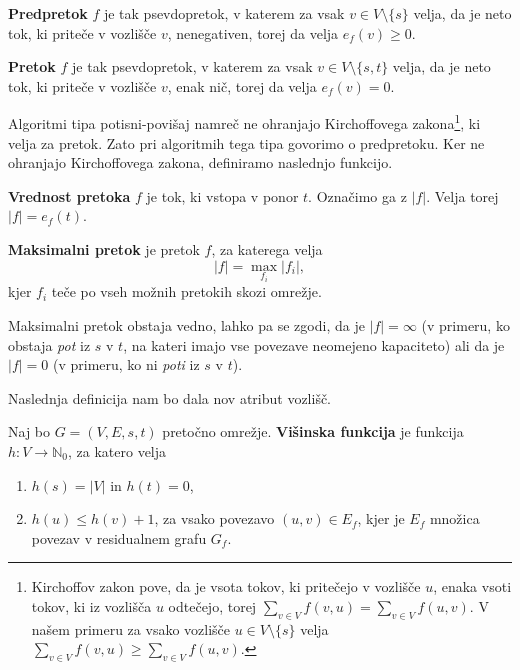 \documentclass[mat1]{fmfdelo}
\newcommand{\N}{\mathbb N}
\begin{document}
\begin{definicija}
\textbf{Predpretok} $f$ je tak psevdopretok, v katerem za vsak $v \in V \setminus\{s\}$ velja, da je neto tok, ki priteče v vozlišče $v$, nenegativen, torej da velja $e_f(v) \geq 0$.
\end{definicija}

\begin{definicija}
\textbf{Pretok} $f$ je tak psevdopretok, v katerem za vsak $v \in V \setminus\{s,t\}$ velja, da je neto tok, ki priteče v vozlišče $v$, enak nič, torej da velja $e_f(v) = 0$.
\end{definicija}

Algoritmi tipa potisni-povišaj namreč ne ohranjajo Kirchoffovega zakona\footnote{Kirchoffov zakon pove, da je vsota tokov, ki pritečejo v vozlišče $u$, enaka vsoti tokov, ki iz vozlišča $u$ odtečejo, torej $\sum_{v\in V} f(v,u) = \sum_{v\in V} f(u,v)$. V našem primeru za vsako vozlišče $u \in V \setminus \{s\}$ velja $\sum_{v\in V} f(v,u) \geq \sum_{v\in V} f(u,v)$.}, ki velja za pretok. Zato pri algoritmih tega tipa govorimo o predpretoku. Ker ne ohranjajo Kirchoffovega zakona, definiramo naslednjo funkcijo.

\begin{definicija}
\textbf{Vrednost pretoka} $f$ je tok, ki vstopa v ponor $t$. Označimo ga z $|f|$. Velja torej $|f| = e_f(t)$.
\end{definicija}

\begin{definicija}
\textbf{Maksimalni pretok} je pretok $f$, za katerega velja \[|f| = \max_{f_i} |f_i|,\] kjer $f_i$ teče po vseh možnih pretokih skozi omrežje.
\end{definicija}

\begin{opomba}
  Maksimalni pretok obstaja vedno, lahko pa se zgodi, da je $|f| = \infty$ (v primeru, ko obstaja \textit{pot} iz $s$ v $t$, na kateri imajo vse povezave neomejeno kapaciteto)
  ali da je $|f| = 0$ (v primeru, ko ni \textit{poti} iz $s$ v $t$).
\end{opomba}

Naslednja definicija nam bo dala nov atribut vozlišč.

\begin{definicija}\label{def:visinska_funkcija}
Naj bo $G=(V,E,s,t)$ pretočno omrežje. \textbf{Višinska funkcija} je funkcija $h\colon V \rightarrow \N_0$, za katero velja
\begin{enumerate}
\item $h(s) = |V|$ in $h(t) = 0$,
\item $h(u) \leq h(v) + 1$, za vsako povezavo $(u,v) \in E_f$, kjer je $E_f$ množica povezav v residualnem grafu $G_f$.
\end{enumerate}
\end{definicija}
\end{document}
